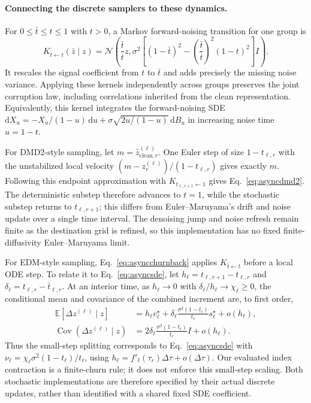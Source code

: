 \documentclass[11pt,letterpaper]{article}
\newcommand{\E}{\mathbb{E}}
\begin{document}
\paragraph{Connecting the discrete samplers to these dynamics.}
For $0\leq\bar t\leq t\leq1$ with $t>0$, a Markov forward-noising transition for one group is
\begin{equation}
 K_{\bar t\leftarrow t}(\bar z\mid z)
 =\mathcal N\!\left(\frac{\bar t}{t}z,
 \sigma^2\left[(1-\bar t)^2-\left(\frac{\bar t}{t}\right)^2(1-t)^2\right]I\right).
 \label{eq:asyncforwardkernel}
\end{equation}
It rescales the signal coefficient from $t$ to $\bar t$ and adds precisely the missing noise variance. Applying these kernels independently across groups preserves the joint corruption law, including correlations inherited from the clean representation. Equivalently, this kernel integrates the forward-noising SDE $\mathrm dX_u=-X_u/(1-u)\,\mathrm du+\sigma\sqrt{2u/(1-u)}\,\mathrm dB_u$ in increasing noise time $u=1-t$.

For DMD2-style sampling, let $m=\widehat z_{\mathrm{clean},r}^{(\ell)}$. One Euler step of size $1-t_{\ell,r}$ with the unstabilized local velocity $(m-z_r^{(\ell)})/(1-t_{\ell,r})$ gives exactly $m$. Following this endpoint approximation with $K_{t_{\ell,r+1}\leftarrow1}$ gives Eq.~\eqref{eq:asyncdmd2}. The deterministic substep therefore advances to $t=1$, while the stochastic substep returns to $t_{\ell,r+1}$; this differs from Euler--Maruyama's drift and noise update over a single time interval. The denoising jump and noise refresh remain finite as the destination grid is refined, so this implementation has no fixed finite-diffusivity Euler--Maruyama limit.

For EDM-style sampling, Eq.~\eqref{eq:asyncchurnback} applies $K_{\bar t\leftarrow t}$ before a local ODE step. To relate it to Eq.~\eqref{eq:asyncsde}, let $h_\ell=t_{\ell,r+1}-t_{\ell,r}$ and $\delta_\ell=t_{\ell,r}-\bar t_{\ell,r}$. At an interior time, as $h_\ell\to0$ with $\delta_\ell/h_\ell\to\chi_\ell\geq0$, the conditional mean and covariance of the combined increment are, to first order,
\begin{equation}
 \begin{aligned}
 \E[\Delta z^{(\ell)}\mid z]
 &=h_\ell v_\ell^\star
 +\delta_\ell\frac{\sigma^2(1-t_\ell)}{t_\ell}s_\ell^\star+o(h_\ell),\\
 \operatorname{Cov}(\Delta z^{(\ell)}\mid z)
 &=2\delta_\ell\frac{\sigma^2(1-t_\ell)}{t_\ell}I+o(h_\ell).
 \end{aligned}
 \label{eq:asyncchurnlimit}
\end{equation}
Thus the small-step splitting corresponds to Eq.~\eqref{eq:asyncsde} with $\nu_\ell=\chi_\ell\sigma^2(1-t_\ell)/t_\ell$, using $h_\ell=f'_\ell(\tau_r)\Delta\tau+o(\Delta\tau)$. Our evaluated index contraction is a finite-churn rule; it does not enforce this small-step scaling. Both stochastic implementations are therefore specified by their actual discrete updates, rather than identified with a shared fixed SDE coefficient.
\end{document}
